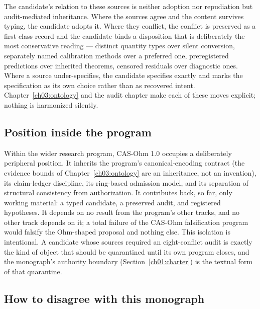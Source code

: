 The candidate's relation to these sources is neither adoption nor repudiation but audit-mediated inheritance. Where the sources agree and the content survives typing, the candidate adopts it. Where they conflict, the conflict is preserved as a first-class record and the candidate binds a disposition that is deliberately the most conservative reading --- distinct quantity types over silent conversion, separately named calibration methods over a preferred one, preregistered predictions over inherited theorems, censored residuals over diagnostic ones. Where a source under-specifies, the candidate specifies exactly and marks the specification as its own choice rather than as recovered intent. Chapter~\ref{ch03:ontology} and the audit chapter make each of these moves explicit; nothing is harmonized silently.

\subsection{Position inside the program}\label{ch01:relation:program}

Within the wider research program, CAS-Ohm 1.0 occupies a deliberately peripheral position. It inherits the program's canonical-encoding contract (the evidence bounds of Chapter~\ref{ch03:ontology} are an inheritance, not an invention), its claim-ledger discipline, its ring-based admission model, and its separation of structural consistency from authorization. It contributes back, so far, only working material: a typed candidate, a preserved audit, and registered hypotheses. It depends on no result from the program's other tracks, and no other track depends on it; a total failure of the CAS-Ohm falsification program would falsify the Ohm-shaped proposal and nothing else. This isolation is intentional. A candidate whose sources required an eight-conflict audit is exactly the kind of object that should be quarantined until its own program closes, and the monograph's authority boundary (Section~\ref{ch01:charter}) is the textual form of that quarantine.

\subsection{How to disagree with this monograph}\label{ch01:relation:disagree}

